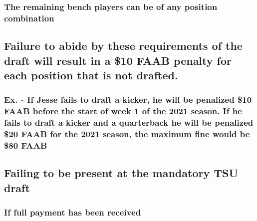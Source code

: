 \documentclass[
]{book}
\begin{document}
\hypertarget{the-remaining-bench-players-can-be-of-any-position-combination}{%
\subsubsection{The remaining bench players can be of any position combination}\label{the-remaining-bench-players-can-be-of-any-position-combination}}

\hypertarget{failure-to-abide-by-these-requirements-of-the-draft-will-result-in-a-10-faab-penalty-for-each-position-that-is-not-drafted.}{%
\subsection{Failure to abide by these requirements of the draft will result in a \$10 FAAB penalty for each position that is not drafted.}\label{failure-to-abide-by-these-requirements-of-the-draft-will-result-in-a-10-faab-penalty-for-each-position-that-is-not-drafted.}}

\hypertarget{ex.---if-jesse-fails-to-draft-a-kicker-he-will-be-penalized-10-faab-before-the-start-of-week-1-of-the-2021-season.-if-he-fails-to-draft-a-kicker-and-a-quarterback-he-will-be-penalized-20-faab-for-the-2021-season-the-maximum-fine-would-be-80-faab}{%
\subsubsection{Ex. - If Jesse fails to draft a kicker, he will be penalized \$10 FAAB before the start of week 1 of the 2021 season. If he fails to draft a kicker and a quarterback he will be penalized \$20 FAAB for the 2021 season, the maximum fine would be \$80 FAAB}\label{ex.---if-jesse-fails-to-draft-a-kicker-he-will-be-penalized-10-faab-before-the-start-of-week-1-of-the-2021-season.-if-he-fails-to-draft-a-kicker-and-a-quarterback-he-will-be-penalized-20-faab-for-the-2021-season-the-maximum-fine-would-be-80-faab}}

\hypertarget{failing-to-be-present-at-the-mandatory-tsu-draft}{%
\subsection{Failing to be present at the mandatory TSU draft}\label{failing-to-be-present-at-the-mandatory-tsu-draft}}

\hypertarget{if-full-payment-has-been-received}{%
\subsubsection{If full payment has been received}\label{if-full-payment-has-been-received}}
\end{document}
